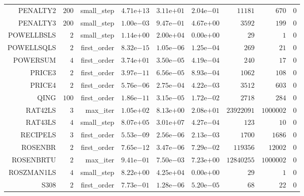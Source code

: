 \begin{longtable}{rrrrrrrrr}
PENALTY2 & \(   200\) & small\_step & \( 4.71\)e\(+13\) & \( 3.11\)e\(+01\) & \( 2.04\)e\(-01\) & \( 11181\) & \(   670\) & \(     0\) \\
PENALTY3 & \(   200\) & small\_step & \( 1.00\)e\(-03\) & \( 9.47\)e\(-01\) & \( 4.67\)e\(+00\) & \(  3592\) & \(   199\) & \(     0\) \\
POWELLBSLS & \(     2\) & small\_step & \( 1.14\)e\(+00\) & \( 2.00\)e\(+04\) & \( 0.00\)e\(+00\) & \(    29\) & \(     1\) & \(     0\) \\
POWELLSQLS & \(     2\) & first\_order & \( 8.32\)e\(-15\) & \( 1.05\)e\(-06\) & \( 1.25\)e\(-04\) & \(   269\) & \(    21\) & \(     0\) \\
POWERSUM & \(     4\) & first\_order & \( 3.74\)e\(+01\) & \( 3.50\)e\(-05\) & \( 4.19\)e\(-04\) & \(   240\) & \(    17\) & \(     0\) \\
PRICE3 & \(     2\) & first\_order & \( 3.97\)e\(-11\) & \( 6.56\)e\(-05\) & \( 8.93\)e\(-04\) & \(  1062\) & \(   108\) & \(     0\) \\
PRICE4 & \(     2\) & first\_order & \( 5.76\)e\(-06\) & \( 2.75\)e\(-04\) & \( 4.22\)e\(-03\) & \(  3512\) & \(   603\) & \(     0\) \\
QING & \(   100\) & first\_order & \( 1.86\)e\(-11\) & \( 3.15\)e\(-05\) & \( 1.72\)e\(-02\) & \(  2718\) & \(   284\) & \(     0\) \\
RAT42LS & \(     3\) & max\_iter & \( 1.05\)e\(+02\) & \( 8.13\)e\(+00\) & \( 2.08\)e\(+01\) & \(23922091\) & \(1000002\) & \(     0\) \\
RAT43LS & \(     4\) & small\_step & \( 8.07\)e\(+05\) & \( 3.01\)e\(+07\) & \( 4.27\)e\(-04\) & \(   123\) & \(    10\) & \(     0\) \\
RECIPELS & \(     3\) & first\_order & \( 5.53\)e\(-09\) & \( 2.56\)e\(-06\) & \( 2.13\)e\(-03\) & \(  1700\) & \(  1686\) & \(     0\) \\
ROSENBR & \(     2\) & first\_order & \( 7.65\)e\(-12\) & \( 3.47\)e\(-06\) & \( 7.29\)e\(-02\) & \(119356\) & \( 12002\) & \(     0\) \\
ROSENBRTU & \(     2\) & max\_iter & \( 9.41\)e\(-01\) & \( 7.50\)e\(-03\) & \( 7.23\)e\(+00\) & \(12840255\) & \(1000002\) & \(     0\) \\
ROSZMAN1LS & \(     4\) & small\_step & \( 8.22\)e\(+00\) & \( 4.25\)e\(+04\) & \( 0.00\)e\(+00\) & \(    29\) & \(     1\) & \(     0\) \\
S308 & \(     2\) & first\_order & \( 7.73\)e\(-01\) & \( 1.28\)e\(-06\) & \( 5.20\)e\(-05\) & \(    68\) & \(    22\) & \(     0\) \\

\end{longtable}
